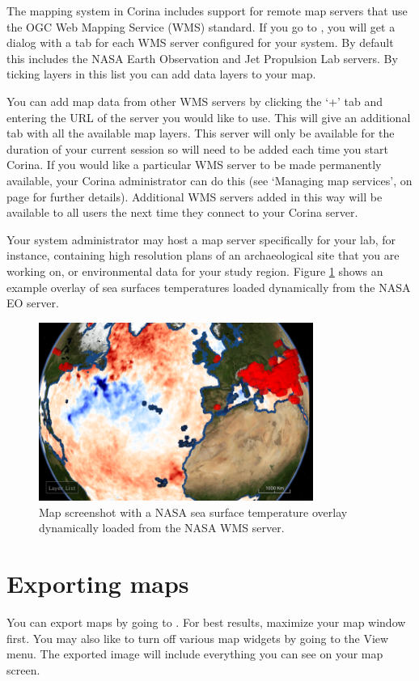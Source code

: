 The mapping system in Corina includes support for remote map servers that use the OGC Web Mapping Service (WMS) standard. If you go to , you will get a dialog with a tab for each WMS server configured for your system. By default this includes the NASA Earth Observation and Jet Propulsion Lab servers.  By ticking layers in this list you can add data layers to your map.

You can add map data from other WMS servers by clicking the `+' tab and entering the URL of the server you would like to use.  This will give an additional tab with all the available map layers.  This server will only be available for the duration of your current session so will need to be added each time you start Corina.  If you would like a particular WMS server to be made permanently available, your Corina administrator can do this (see `Managing map services', on page \pageref{txt:managingmaps} for further details).  Additional WMS servers added in this way will be available to all users the next time they connect to your Corina server.

Your system administrator may host a map server specifically for your lab, for instance, containing high resolution plans of an archaeological site that you are working on, or environmental data for your study region. Figure \ref{fig:wms} shows an example overlay of sea surfaces temperatures loaded dynamically from the NASA EO server.

\begin{figure}[hbtp]
  \centering
  \includegraphics[width=0.8\textwidth]{Images/sst.png}
  \caption{Map screenshot with a NASA sea surface temperature overlay dynamically loaded from the NASA WMS server.}
  \label{fig:wms}
\end{figure}





\section{Exporting maps}
You can export maps by going to . For best results, maximize your map window first. You may also like to turn off various map widgets by going to the View menu. The exported image will include everything you can see on your map screen. 


